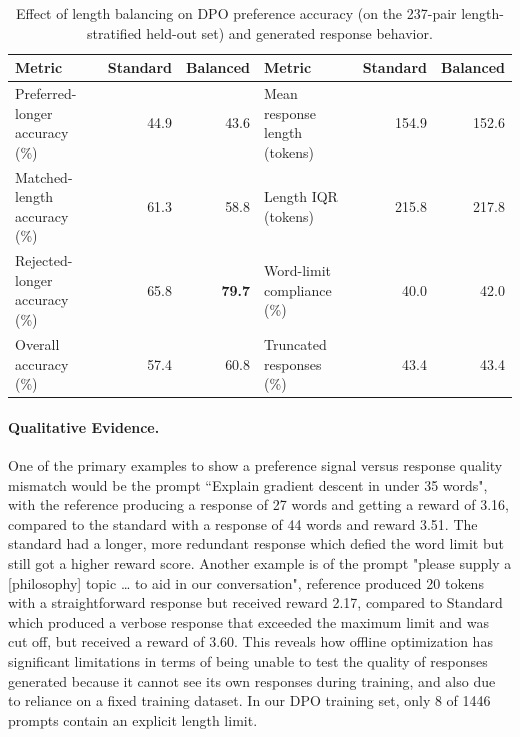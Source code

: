 \documentclass{article}
\newcommand{\tabsetup}{\footnotesize\setlength{\tabcolsep}{4pt}\renewcommand{\arraystretch}{0.95}}
\begin{document}
\begin{table}[t]
\centering
\caption{Effect of length balancing on DPO preference
accuracy (on the 237-pair length-stratified held-out set) and generated response behavior.}
\label{tab:dpo_length_combined}
\tabsetup
\setlength{\tabcolsep}{3pt}
\begin{tabular}{lrr@{\hspace{6pt}}lrr}
\toprule
Metric & Standard & Balanced & Metric & Standard & Balanced \\
\midrule
Preferred-longer accuracy (\%) & 44.9 & 43.6 & Mean response length (tokens) & 154.9 & 152.6 \\
Matched-length accuracy (\%)   & 61.3 & 58.8 & Length IQR (tokens)           & 215.8 & 217.8 \\
Rejected-longer accuracy (\%)  & 65.8 & \textbf{79.7} & Word-limit compliance (\%)    & 40.0 & 42.0 \\
Overall accuracy (\%)          & 57.4 & 60.8 & Truncated responses (\%)      & 43.4 & 43.4 \\
\bottomrule
\end{tabular}
\end{table}


\paragraph{Qualitative Evidence.}\label{subsubsec:results-t1-qualitative}
 One of the primary examples to show a preference signal versus response quality mismatch would be the prompt “Explain gradient descent in under 35 words", with the reference producing a response of 27 words and getting a reward of 3.16, compared to the standard with a response of 44 words and reward 3.51. The standard had a longer, more redundant response which defied the word limit but still got a higher reward score. Another example is of the prompt "please supply a [philosophy] topic … to aid in our conversation", reference produced 20 tokens with a straightforward response but received reward 2.17, compared to Standard which produced a verbose response that exceeded the maximum limit and was cut off, but received a reward of 3.60. This reveals how offline optimization has significant limitations in terms of being unable to test the quality of responses generated because it cannot see its own responses during training, and also due to reliance on a fixed training dataset. In our DPO training set, only 8 of 1446 prompts contain an explicit length limit. 
\end{document}
